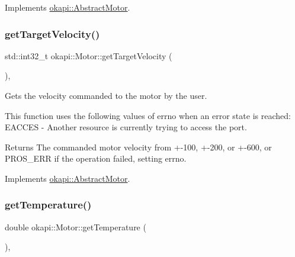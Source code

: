 Implements \mbox{\hyperlink{classokapi_1_1AbstractMotor_a144377e461ec5801289c37bab5132cce}{okapi\+::\+Abstract\+Motor}}.

\mbox{\label{classokapi_1_1Motor_aee4697f4e1f39bc0206062d0247caf47}} 
\subsubsection{\texorpdfstring{getTargetVelocity()}{getTargetVelocity()}}
{\footnotesize\ttfamily std\+::int32\+\_\+t okapi\+::\+Motor\+::get\+Target\+Velocity (\begin{DoxyParamCaption}{ }\end{DoxyParamCaption})\hspace{0.3cm}{\ttfamily [override]}, {\ttfamily [virtual]}}

Gets the velocity commanded to the motor by the user.

This function uses the following values of errno when an error state is reached\+: E\+A\+C\+C\+ES -\/ Another resource is currently trying to access the port.

\begin{DoxyReturn}{Returns}
The commanded motor velocity from +-\/100, +-\/200, or +-\/600, or P\+R\+O\+S\+\_\+\+E\+RR if the operation failed, setting errno. 
\end{DoxyReturn}


Implements \mbox{\hyperlink{classokapi_1_1AbstractMotor_a96b02cca7b51f75c01d2d22aab474fe4}{okapi\+::\+Abstract\+Motor}}.

\mbox{\label{classokapi_1_1Motor_ab5b9208b001c1ab49f8c058eff58e5b3}} 
\subsubsection{\texorpdfstring{getTemperature()}{getTemperature()}}
{\footnotesize\ttfamily double okapi\+::\+Motor\+::get\+Temperature (\begin{DoxyParamCaption}{ }\end{DoxyParamCaption})\hspace{0.3cm}{\ttfamily [override]}, {\ttfamily [virtual]}}

